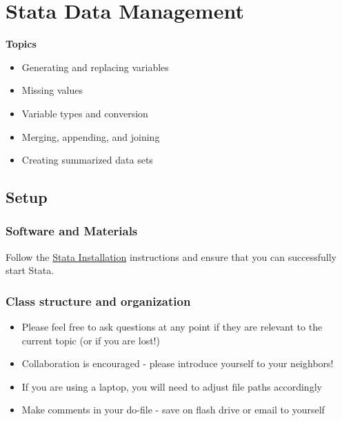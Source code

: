 \documentclass[
]{book}
\providecommand{\tightlist}{%
  \setlength{\itemsep}{0pt}\setlength{\parskip}{0pt}}
\begin{document}
\hypertarget{stata-data-management}{%
\chapter{Stata Data Management}\label{stata-data-management}}

\textbf{Topics}

\begin{itemize}
\tightlist
\item
  Generating and replacing variables
\item
  Missing values
\item
  Variable types and conversion
\item
  Merging, appending, and joining
\item
  Creating summarized data sets
\end{itemize}

\hypertarget{setup-7}{%
\section{Setup}\label{setup-7}}

\hypertarget{software-and-materials-7}{%
\subsection{Software and Materials}\label{software-and-materials-7}}

Follow the \href{./StataInstall.html}{Stata Installation} instructions and ensure that you can successfully start Stata.

\hypertarget{class-structure-and-organization-1}{%
\subsection{Class structure and organization}\label{class-structure-and-organization-1}}

\begin{itemize}
\tightlist
\item
  Please feel free to ask questions at any point if they are relevant to the current topic (or if you are lost!)
\item
  Collaboration is encouraged - please introduce yourself to your neighbors!
\item
  If you are using a laptop, you will need to adjust file paths accordingly
\item
  Make comments in your do-file - save on flash drive or email to yourself
\end{itemize}
\end{document}
